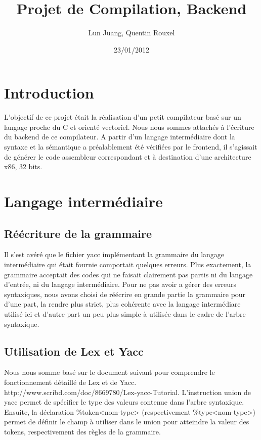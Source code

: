 \documentclass[a4paper, 11pt]{article}
\title{Projet de Compilation, Backend}
\author{Lun Juang, Quentin Rouxel}
\date{23/01/2012}
\begin{document}
\maketitle{}

\section{Introduction}

L'objectif de ce projet était la réalisation d'un petit compilateur basé sur un langage proche du C et orienté vectoriel.
Nous nous sommes attachés à l'écriture du backend de ce compilateur. A partir d'un langage intermédiaire dont la syntaxe et la sémantique
a préalablement été vérifiées par le frontend, il s'agissait de générer le code assembleur correspondant et à destination d'une architecture
x86, 32 bits.

\section{Langage intermédiaire}

\subsection{Réécriture de la grammaire}

Il s'est avéré que le fichier yacc implémentant la grammaire du langage intermédiaire qui était fournie comportait quelques erreurs.
Plus exactement, la grammaire acceptait des codes qui ne faisait clairement pas partis ni du langage d'entrée, ni du langage intermédiaire.
Pour ne pas avoir a gérer des erreurs syntaxiques, nous avons choisi de réécrire en grande partie la grammaire 
pour d'une part, la rendre plus strict, plus cohérente avec la langage intermédiare utilisé ici et d'autre part un peu plus simple à
utilisée dans le cadre de l'arbre syntaxique.

\subsection{Utilisation de Lex et Yacc}

Nous nous somme basé sur le document suivant pour comprendre le fonctionnement détaillé de Lex et de Yacc. 
http://www.scribd.com/doc/8669780/Lex-yacc-Tutorial.
L'instruction union de yacc permet de spécifier le type des valeurs contenue dans l'arbre syntaxique. Ensuite, la déclaration
\%token<nom-type> (respectivement \%type<nom-type>) permet de définir le champ à utiliser dans le union pour atteindre la valeur des tokens, 
respectivement des règles de la grammaire.
\end{document}
